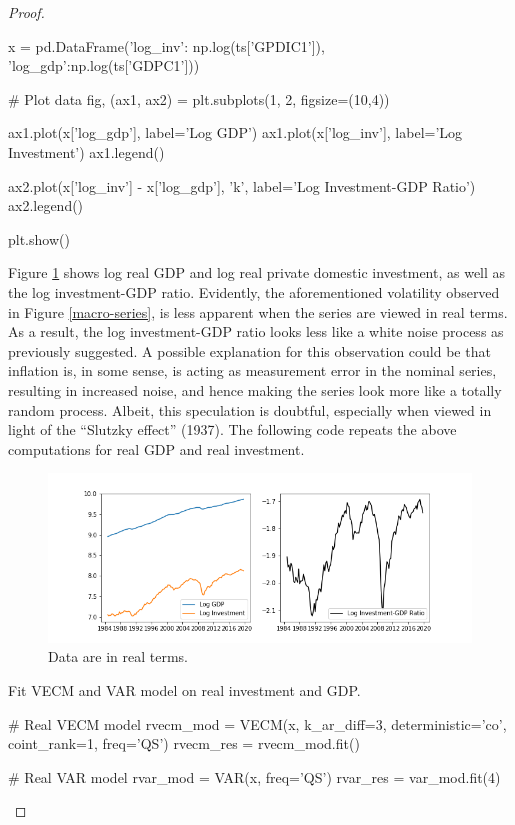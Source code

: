 \documentclass[oneside,reqno]{amsart}
\theoremstyle{definition}
\begin{document}
\begin{enumerate}[label=(\roman*)]
\begin{proof}
\begin{python3code}
x = pd.DataFrame({'log_inv': np.log(ts['GPDIC1']),
                  'log_gdp':np.log(ts['GDPC1'])})

# Plot data
fig, (ax1, ax2) = plt.subplots(1, 2, figsize=(10,4))

ax1.plot(x['log_gdp'], label='Log GDP')
ax1.plot(x['log_inv'], label='Log Investment')
ax1.legend()

ax2.plot(x['log_inv'] - x['log_gdp'], 'k', label='Log Investment-GDP Ratio')
ax2.legend()

plt.show()
\end{python3code}

Figure \ref{real-macro-series} shows log real GDP and log real private domestic investment, as well as the log investment-GDP ratio. Evidently, the aforementioned volatility observed in Figure \ref{macro-series}, is less apparent when the series are viewed in real terms. As a result, the log investment-GDP ratio looks less like a white noise process as previously suggested. A possible explanation for this observation could be that inflation is, in some sense, is acting as measurement error in the nominal series, resulting in increased noise, and hence making the series look more like a totally random process. Albeit, this speculation is doubtful, especially when viewed in light of the ``Slutzky  effect'' (1937). The following code repeats the above computations for real GDP and real investment. 

\begin{figure}
\includegraphics[width=\textwidth]{real-macro-series}
\caption{Data are in real terms.}
\label{real-macro-series}
\end{figure}

Fit VECM and VAR model on real investment and GDP.
\begin{python3code}
# Real VECM model
rvecm_mod = VECM(x, k_ar_diff=3, deterministic='co',
                coint_rank=1, freq='QS')
rvecm_res = rvecm_mod.fit()

# Real VAR model
rvar_mod = VAR(x, freq='QS')
rvar_res = var_mod.fit(4)
\end{python3code}


\end{proof}
\end{enumerate}
\end{document}
